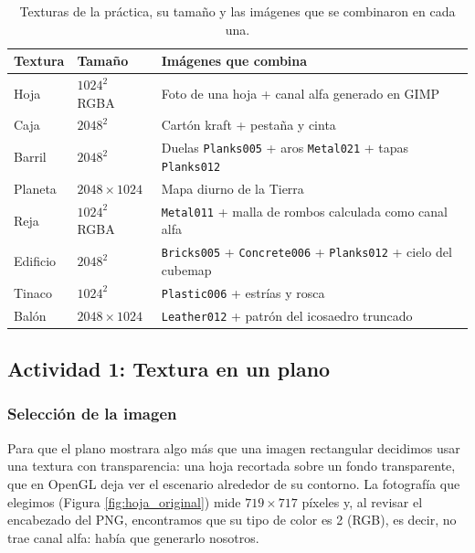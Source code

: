 \begin{table}[H]
\centering
\renewcommand{\arraystretch}{1.2}
\begin{tabular}{|p{2.6cm}|p{2.3cm}|p{9.6cm}|}
\hline
\textbf{Textura} & \textbf{Tamaño} & \textbf{Imágenes que combina} \\ \hline
Hoja & $1024^2$ RGBA & Foto de una hoja \cite{hoja_commons} + canal alfa generado en GIMP \\ \hline
Caja & $2048^2$ & Cartón kraft \cite{carton_commons} + pestaña y cinta \\ \hline
Barril & $2048^2$ & Duelas \texttt{Planks005} + aros \texttt{Metal021} + tapas \texttt{Planks012} \cite{ambientcg} \\ \hline
Planeta & $2048 \times 1024$ & Mapa diurno de la Tierra \cite{solarsystemscope} \\ \hline
Reja & $1024^2$ RGBA & \texttt{Metal011} \cite{ambientcg} + malla de rombos calculada como canal alfa \\ \hline
Edificio & $2048^2$ & \texttt{Bricks005} + \texttt{Concrete006} + \texttt{Planks012} \cite{ambientcg} + cielo del cubemap \cite{humus} \\ \hline
Tinaco & $1024^2$ & \texttt{Plastic006} \cite{ambientcg} + estrías y rosca \\ \hline
Balón & $2048 \times 1024$ & \texttt{Leather012} \cite{ambientcg} + patrón del icosaedro truncado \\ \hline
\end{tabular}
\caption{Texturas de la práctica, su tamaño y las imágenes que se combinaron en cada una.}
\label{tab:texturas}
\end{table}

\subsection{Actividad 1: Textura en un plano}

\subsubsection{Selección de la imagen}
Para que el plano mostrara algo más que una imagen rectangular decidimos usar una textura con transparencia: una hoja recortada sobre un fondo transparente, que en OpenGL deja ver el escenario alrededor de su contorno. La fotografía que elegimos \cite{hoja_commons} (Figura \ref{fig:hoja_original}) mide $719 \times 717$ píxeles y, al revisar el encabezado del PNG, encontramos que su tipo de color es 2 (RGB), es decir, no trae canal alfa: había que generarlo nosotros.

